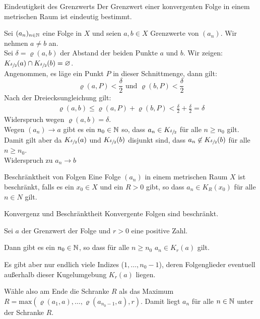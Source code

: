 \begin{satz}{Eindeutigkeit des Grenzwerts}
	Der Grenzwert einer konvergenten Folge in einem metrischen Raum ist eindeutig bestimmt.
\end{satz}
\beweis
Sei $(a_n)_{n\in\mathbb{N}}$ eine Folge in $X$ und seien $a,b\in X$ Grenzwerte von $(a_n)$. Wir nehmen $a\neq b$ an.\\
Sei $\delta=\varrho(a,b)$ der Abstand der beiden Punkte $a$ und $b$. Wir zeigen: $K_{\sfrac{\delta}{2}}(a)\cap K_{\sfrac{\delta}{2}}(b)=\varnothing$.\\
Angenommen, es läge ein Punkt $P$ in dieser Schnittmenge, dann gilt:
\begin{equation*}
	\varrho(a,P)<\frac\delta2 \text{ und } \varrho(b,P)<\frac\delta2
\end{equation*}
Nach der Dreiecksungleichung gilt:
\begin{align*}
	\varrho(a,b)\leq \varrho(a,P) + \varrho(b,P) < \frac\delta2 + \frac\delta2 = \delta
\end{align*}
Widerspruch wegen $\varrho(a,b)=\delta$.\\
Wegen $(a_n)\rightarrow a$ gibt es ein $n_0\in\mathbb{N}$ so, dass $a_n\in K_{\sfrac\delta2}$ für alle $n\geq n_0$ gilt.\\
Damit gilt aber da $K_{\sfrac{\delta}{2}}(a)$ und $K_{\sfrac{\delta}{2}}(b)$ disjunkt sind, dass $a_n\not\in K_{\sfrac{\delta}{2}}(b)$ für alle $n\geq n_0$.\\
Widerspruch zu $a_n\rightarrow b$

\begin{definition}{Beschränktheit von Folgen}
	Eine Folge $(a_n)$ in einem metrischen Raum $X$ ist beschränkt, falls es ein $x_0\in X$ und ein $R>0$ gibt, so dass $a_n\in K_R(x_0)$ für alle $n\in N$ gilt.
\end{definition}
\begin{satz}{Konvergenz und Beschränktheit}
	Konvergente Folgen sind beschränkt.
\end{satz}
\beweis
Sei $a$ der Grenzwert der Folge und $r>0$ eine positive Zahl.

Dann gibt es ein $n_0\in\mathbb{N}$, so dass für alle $n\geq n_0$ $a_n\in K_r(a)$ gilt.

Es gibt aber nur endlich viele Indizes ($1,\ldots,n_0-1$), deren Folgenglieder eventuell außerhalb dieser Kugelumgebung $K_r(a)$ liegen.

Wähle also am Ende die Schranke $R$ als das Maximum $R=\mathrm{max}(\varrho(a_1,a),\ldots,\varrho(a_{n_0-1},a),r)$. Damit liegt $a_n$ für alle $n\in\mathbb{N}$ unter der Schranke $R$.
